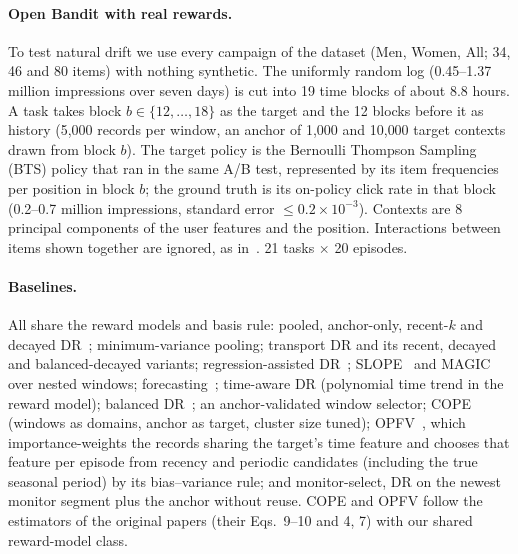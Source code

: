 \paragraph{Open Bandit with real rewards.}
To test natural drift we use every campaign of the dataset (Men, Women, All; 34, 46 and 80
items) with nothing synthetic. The uniformly random log (0.45--1.37 million impressions over
seven days) is cut into 19 time blocks of about 8.8 hours. A task takes block $b\in\{12,\dots,18\}$
as the target and the 12 blocks before it as history (5{,}000 records per window, an anchor of
1{,}000 and 10{,}000 target contexts drawn from block $b$). The target policy is the Bernoulli
Thompson Sampling (BTS) policy that ran in the same A/B test, represented by its item
frequencies per position in block $b$; the ground truth is its on-policy click rate in that
block (0.2--0.7 million impressions, standard error $\le0.2\times10^{-3}$). Contexts are 8
principal components of the user features and the position. Interactions between items shown
together are ignored, as in~\cite{saito2021open}. 21 tasks $\times$ 20 episodes.

\paragraph{Baselines.}
All share the reward models and basis rule: pooled, anchor-only, recent-$k$ and decayed
DR~\cite{jagerman2019when}; minimum-variance pooling; transport DR and its recent, decayed and
balanced-decayed variants; regression-assisted DR~\cite{liu2023asymptotically};
SLOPE~\cite{su2020adaptive} and MAGIC~\cite{thomas2016data} over nested windows;
forecasting~\cite{thomas2017predictive}; time-aware DR (polynomial time trend in the reward
model); balanced DR~\cite{agarwal2017effective}; an anchor-validated window selector;
COPE~\cite{natsubori2025cross} (windows as domains, anchor as target, cluster size tuned); OPFV~\cite{shimizu2025offpolicy},
which importance-weights the records sharing the target's time feature and chooses that feature per
episode from recency and periodic candidates (including the true seasonal period) by its
bias--variance rule; and monitor-select, DR on the newest monitor segment plus the anchor without
reuse. COPE and OPFV follow the estimators of the original papers (their Eqs.~9--10 and 4, 7) with our
shared reward-model class.


